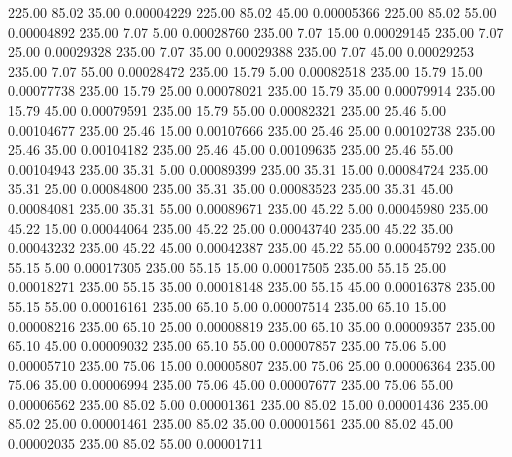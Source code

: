     225.00     85.02     35.00     0.00004229
    225.00     85.02     45.00     0.00005366
    225.00     85.02     55.00     0.00004892
    235.00      7.07      5.00     0.00028760
    235.00      7.07     15.00     0.00029145
    235.00      7.07     25.00     0.00029328
    235.00      7.07     35.00     0.00029388
    235.00      7.07     45.00     0.00029253
    235.00      7.07     55.00     0.00028472
    235.00     15.79      5.00     0.00082518
    235.00     15.79     15.00     0.00077738
    235.00     15.79     25.00     0.00078021
    235.00     15.79     35.00     0.00079914
    235.00     15.79     45.00     0.00079591
    235.00     15.79     55.00     0.00082321
    235.00     25.46      5.00     0.00104677
    235.00     25.46     15.00     0.00107666
    235.00     25.46     25.00     0.00102738
    235.00     25.46     35.00     0.00104182
    235.00     25.46     45.00     0.00109635
    235.00     25.46     55.00     0.00104943
    235.00     35.31      5.00     0.00089399
    235.00     35.31     15.00     0.00084724
    235.00     35.31     25.00     0.00084800
    235.00     35.31     35.00     0.00083523
    235.00     35.31     45.00     0.00084081
    235.00     35.31     55.00     0.00089671
    235.00     45.22      5.00     0.00045980
    235.00     45.22     15.00     0.00044064
    235.00     45.22     25.00     0.00043740
    235.00     45.22     35.00     0.00043232
    235.00     45.22     45.00     0.00042387
    235.00     45.22     55.00     0.00045792
    235.00     55.15      5.00     0.00017305
    235.00     55.15     15.00     0.00017505
    235.00     55.15     25.00     0.00018271
    235.00     55.15     35.00     0.00018148
    235.00     55.15     45.00     0.00016378
    235.00     55.15     55.00     0.00016161
    235.00     65.10      5.00     0.00007514
    235.00     65.10     15.00     0.00008216
    235.00     65.10     25.00     0.00008819
    235.00     65.10     35.00     0.00009357
    235.00     65.10     45.00     0.00009032
    235.00     65.10     55.00     0.00007857
    235.00     75.06      5.00     0.00005710
    235.00     75.06     15.00     0.00005807
    235.00     75.06     25.00     0.00006364
    235.00     75.06     35.00     0.00006994
    235.00     75.06     45.00     0.00007677
    235.00     75.06     55.00     0.00006562
    235.00     85.02      5.00     0.00001361
    235.00     85.02     15.00     0.00001436
    235.00     85.02     25.00     0.00001461
    235.00     85.02     35.00     0.00001561
    235.00     85.02     45.00     0.00002035
    235.00     85.02     55.00     0.00001711
